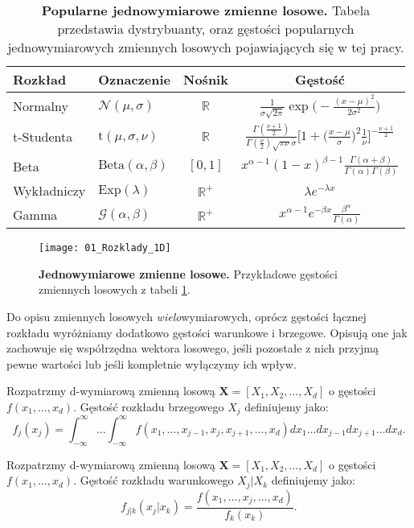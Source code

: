 \begin{table}[h]
	\caption{\textbf{Popularne jednowymiarowe zmienne losowe.} Tabela przedstawia dystrybuanty, oraz gęstości popularnych jednowymiarowych zmiennych losowych pojawiających się w tej pracy.}
	\label{tab:przykladowe_zmienne_losowe}
	\centering
	\begin{tabular}{ll|c|c}
		\hline
		\textbf{Rozkład} & \textbf{Oznaczenie} & \textbf{Nośnik} & \textbf{Gęstość} \\
		\hline
		Normalny & $\mathcal{N}(\mu, \sigma)$ & $\mathbb{R}$ & $\frac{1}{\sigma \sqrt{2 \pi}} \exp\big(-\frac{(x-\mu)^2}{2\sigma^2}\big)$\\ 
		t-Studenta & $\text{t}(\mu, \sigma, \nu)$ & $\mathbb{R}$ & $ \frac{\Gamma(\frac{\nu + 1}{2})}{\Gamma(\frac{\nu}{2})\sqrt{\pi\nu}\sigma} \bigg[1 + \big(\frac{x - \mu}{\sigma}\big)^2\frac{1}{\nu}\bigg]^{-\frac{\nu + 1}{2}} $ \\ 
		Beta & $\text{Beta}(\alpha, \beta)$ & $[0, 1]$ & $ x^{\alpha - 1}(1 - x)^{\beta - 1}\frac{\Gamma(\alpha + \beta)}{\Gamma(\alpha)\Gamma(\beta)}$ \\ 
		Wykładniczy & $\text{Exp}(\lambda)$ & $\mathbb{R}^{+}$ & $ \lambda e^{-\lambda x}$ \\
		Gamma & $\mathcal{G}(\alpha, \beta)$ & $\mathbb{R}^+$ & $x^{\alpha - 1}e^{-\beta x}\frac{\beta^\alpha}{\Gamma(\alpha)}$\\ 
		
		\hline
	\end{tabular}
\end{table}

\begin{figure}[H]
	\centering
	\texttt{[image: 01\_Rozklady\_1D]}
	\caption{\textbf{Jednowymiarowe zmienne losowe.} Przykładowe gęstości zmiennych losowych z tabeli \ref{tab:przykladowe_zmienne_losowe}.\label{fig:przykladowe_zmienne_losowe}}
\end{figure}

Do opisu zmiennych losowych \emph{wielo}wymiarowych, oprócz gęstości łącznej rozkładu wyróżniamy dodatkowo gęstości warunkowe i brzegowe. Opisują one jak zachowuje się współrzędna wektora losowego, jeśli pozostałe z nich przyjmą pewne wartości lub jeśli kompletnie wyłączymy ich wpływ.

\begin{df}
	Rozpatrzmy d-wymiarową zmienną losową $\mathbf{X} = [X_1, X_2, \dots, X_d]$ o gęstości $f(x_1, \dots, x_d)$. Gęstość rozkładu brzegowego $X_j$ definiujemy jako:
	$$f_j(x_j)=\int_{-\infty}^{\infty}\dots\int_{-\infty}^{\infty} f(x_1, \dots, x_{j-1}, x_j, x_{j+1}, \dots, x_d)  dx_1\dots dx_{j-1} dx_{j+1} \dots dx_d.$$
\end{df}

\begin{df}
	Rozpatrzmy d-wymiarową zmienną losową $\mathbf{X} = [X_1, X_2, \dots, X_d]$ o gęstości $f(x_1, \dots, x_d)$. Gęstość rozkładu warunkowego $X_j \vert X_k$ definiujemy jako:
	$$f_{j|k}(x_j|x_k) = \frac{f(x_1, \dots, x_j, \dots,  x_d)}{f_k(x_k)}.$$
\end{df}
